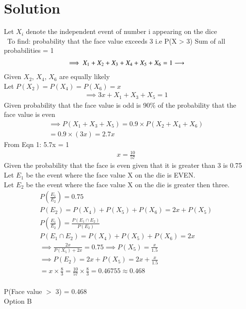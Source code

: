 \documentclass[journal,12pt,twocolumn]{IEEEtran}
\begin{document}
\section{\Large Solution}
Let $X_i$ denote the independent event of number i appearing on 
the dice\\\
To find: probability that the face value exceeds 3 i.e P(X > 3)
Sum of all probabilities = 1\\[5pt]
\begin{align}
\implies \space X_1 + X_2 + X_3 + X_4 + X_5 + X_6 = 1 \longrightarrow
\end{align}
Given $X_2$, $X_4$, $X_6$ are equally likely\\
Let $P(X_2) = P(X_4) = P(X_6) = x $
\begin{align}
\implies 3x + X_1 + X_3 + X_5 = 1
\end{align}
Given probability that the face value is odd is 90\% of the probability that the face value is even
\begin{align}
\implies P(X_1 + X_3 + X_5) = 0.9 \times P(X_2 + X_4 + X_6)\\
 = 0.9 \times (3x) = 2.7x
 \end{align}
From Eqn 1: 5.7x = 1
\begin{align}
    x = \frac{10}{57}
\end{align}
Given the probability that the face is even given that it is greater than 3 is 0.75\\
Let $E_1$ be the event where the face value X on the die is EVEN.\\
Let $E_2$ be the event where the face value X on the die is greater then three.
\begin{align}
P\left(\frac{E_1}{E_2}\right) = 0.75\\
P(E_2) = P(X_4) + P(X_5) + P(X_6) = 2x + P(X_5)\\[5pt]
P \left( \frac{E_1}{E_2} \right) = \frac{P(E_1 \cap E_2)}{P(E_2)}\\[5pt]
P(E_1 \cap E_2) = P(X_4) + P(X_5) + P(X_6) = 2x\\[5pt]
\implies \frac{2x}{P(X_5) + 2x} = 0.75 \implies
P(X_5) = \frac{x}{1.5}\\[3pt]
\implies P(E_2) = 2x + P(X_5) = 2x + \frac{x}{1.5}\\[5pt]
= x \times \frac{8}{3} = \frac{10}{57} \times \frac{8}{3} = 0.46755 \approx 0.468
\end{align}\\
\centering \large P(\normal Face value \large $>$ 3) = 0.468\\[5pt]
Option B
\end{document}
